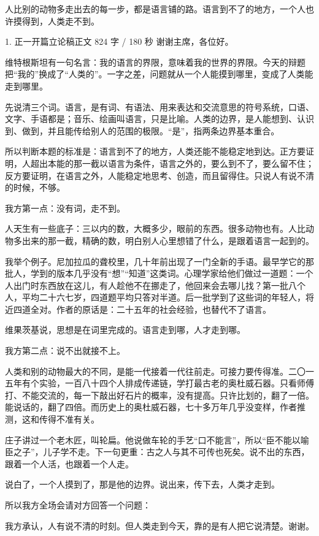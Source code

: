 \documentclass[script,pro]{debate}
\begin{document}
\debatetitle
\begin{thesisbox}[全场一句话立论]人比别的动物多走出去的每一步，都是语言铺的路。语言到不了的地方，一个人也许摸得到，人类走不到。\end{thesisbox}

\begin{speech}{1. 正一开篇立论稿}{正文 824 字 / 180 秒}
谢谢主席，各位好。

维特根斯坦有一句名言：我的语言的界限，意味着我的世界的界限。今天的辩题把“我的”换成了“人类的”。一字之差，问题就从一个人能摸到哪里，变成了人类能走到哪里。

先说清三个词。语言，是有词、有语法、用来表达和交流意思的符号系统，口语、文字、手语都是；音乐、绘画叫语言，只是比喻。人类的边界，是人能想到、认识到、做到，并且能传给别人的范围的极限。“是”，指两条边界基本重合。

所以判断本题的标准是：语言到不了的地方，人类还能不能稳定地到达。正方要证明，人超出本能的那一截以语言为条件，语言之外的，要么到不了，要么留不住；反方要证明，在语言之外，人能稳定地思考、创造，而且留得住。只说人有说不清的时候，不够。

我方第一点：没有词，走不到。

人天生有一些底子：三以内的数，大概多少，眼前的东西。很多动物也有。人比动物多出来的那一截，精确的数，明白别人心里想错了什么，是跟着语言一起到的。

我举个例子。尼加拉瓜的聋校里，几十年前出现了一门全新的手语。最早学它的那批人，学到的版本几乎没有“想”“知道”这类词。心理学家给他们做过一道题：一个人出门时东西放在这儿，有人趁他不在挪走了，他回来会去哪儿找？第一批八个人，平均二十六七岁，四道题平均只答对半道。后一批学到了这些词的年轻人，将近四道全对。作者的原话是：二十五年的社会经验，也替代不了语言。

维果茨基说，思想是在词里完成的。语言走到哪，人才走到哪。

我方第二点：说不出就接不上。

人类和别的动物最大的不同，是能一代接着一代往前走。可接力要传得准。二〇一五年有个实验，一百八十四个人排成传递链，学打最古老的奥杜威石器。只看师傅打、不能交流的，每一下敲出好石片的概率，没有提高。只许比划的，翻了一倍。能说话的，翻了四倍。而历史上的奥杜威石器，七十多万年几乎没变样，作者推测，这和传得不准有关。

庄子讲过一个老木匠，叫轮扁。他说做车轮的手艺“口不能言”，所以“臣不能以喻臣之子”，儿子学不走。下一句更重：古之人与其不可传也死矣。说不出的东西，跟着一个人活，也跟着一个人走。

说白了，一个人摸到了，那是他的边界。说出来，传下去，人类才走到。

所以我方全场会请对方回答一个问题：

我方承认，人有说不清的时刻。但人类走到今天，靠的是有人把它说清楚。谢谢。
\end{speech}
\end{document}
